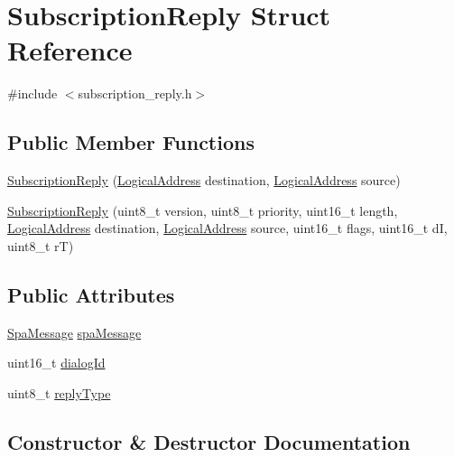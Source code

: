 \hypertarget{structSubscriptionReply}{}\section{Subscription\+Reply Struct Reference}
\label{structSubscriptionReply}


{\ttfamily \#include $<$subscription\+\_\+reply.\+h$>$}

\subsection*{Public Member Functions}
\begin{DoxyCompactItemize}
\item 
\hyperlink{structSubscriptionReply_a8b41ba60bc85ee15f7bddbaec3260ad0}{Subscription\+Reply} (\hyperlink{structLogicalAddress}{Logical\+Address} destination, \hyperlink{structLogicalAddress}{Logical\+Address} source)
\item 
\hyperlink{structSubscriptionReply_a8e656028ab7b6750157b6d0ebbf06659}{Subscription\+Reply} (uint8\+\_\+t version, uint8\+\_\+t priority, uint16\+\_\+t length, \hyperlink{structLogicalAddress}{Logical\+Address} destination, \hyperlink{structLogicalAddress}{Logical\+Address} source, uint16\+\_\+t flags, uint16\+\_\+t dI, uint8\+\_\+t rT)
\end{DoxyCompactItemize}
\subsection*{Public Attributes}
\begin{DoxyCompactItemize}
\item 
\hyperlink{structSpaMessage}{Spa\+Message} \hyperlink{structSubscriptionReply_a4e4c24f7a85c8c2ac00604e9edf0bbab}{spa\+Message}
\item 
uint16\+\_\+t \hyperlink{structSubscriptionReply_a8fc1a335af866ee6e1328106421fee66}{dialog\+Id}
\item 
uint8\+\_\+t \hyperlink{structSubscriptionReply_a289965f913a0dac7204482b86798ed5a}{reply\+Type}
\end{DoxyCompactItemize}


\subsection{Constructor \& Destructor Documentation}
\mbox{\label{structSubscriptionReply_a8b41ba60bc85ee15f7bddbaec3260ad0}} 
